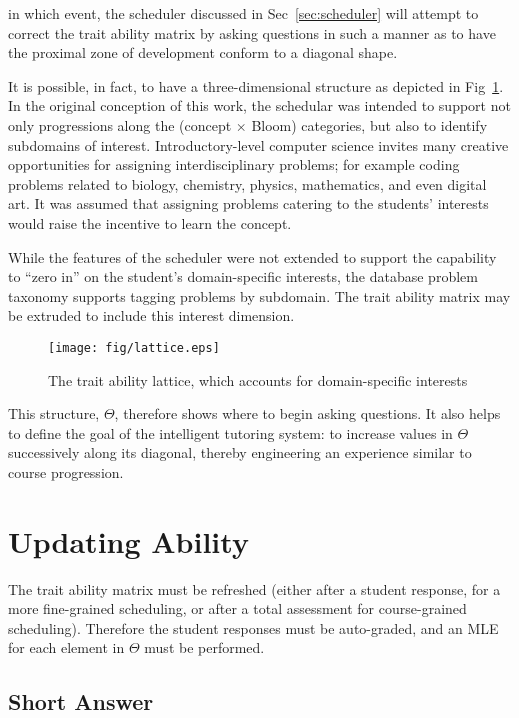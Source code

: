 in which event, the scheduler discussed in Sec~\ref{sec:scheduler} will attempt
to correct the trait ability matrix by asking questions in such a manner as to
have the proximal zone of development conform to a diagonal shape.

It is possible, in fact, to have a three-dimensional structure as depicted in
Fig~\ref{fig:lattice}.  In the original conception of this work, the schedular
was intended to support not only progressions along the (concept $\times$
Bloom) categories, but also to identify subdomains of interest.
Introductory-level computer science invites many creative opportunities for
assigning interdisciplinary problems; for example coding problems related to
biology, chemistry, physics, mathematics, and even digital art.  It was assumed
that assigning problems catering to the students' interests would raise the
incentive to learn the concept.  

While the features of the scheduler were not extended to support the capability
to ``zero in'' on the student's domain-specific interests, the database problem
taxonomy supports tagging problems by subdomain.  The trait ability matrix may
be extruded to include this interest dimension.

\begin{figure}[p!]
 \label{fig:lattice}
 \texttt{[image: fig/lattice.eps]} 
 \caption{The trait ability lattice, which accounts for domain-specific 
  interests}
\end{figure}

This structure, $\Theta$, therefore shows where to begin asking questions.  It
also helps to define the goal of the intelligent tutoring system: to increase
values in $\Theta$ successively along its diagonal, thereby engineering an
experience similar to course progression.

\section{Updating Ability}

The trait ability matrix must be refreshed (either after a student response,
for a more fine-grained scheduling, or after a total assessment for
course-grained scheduling).  Therefore the student responses must be
auto-graded, and an MLE for each element in $\Theta$ must be performed.

\subsection{Short Answer}

